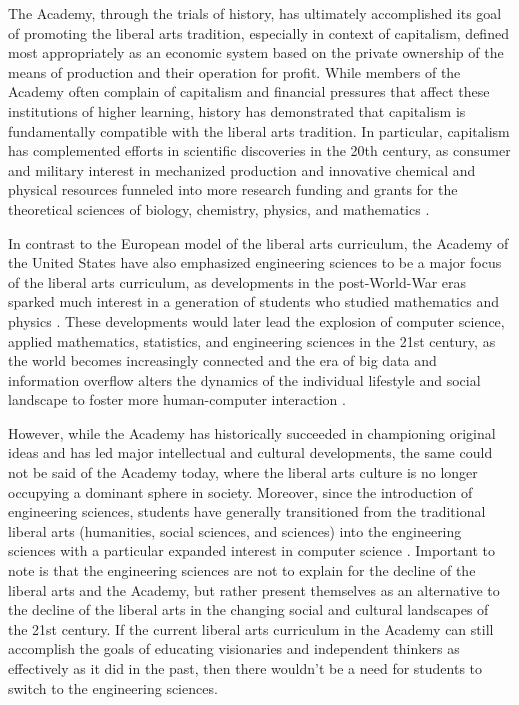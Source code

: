 \documentclass[12pt,letterpaper]{article}
\begin{document}
The Academy, through the trials of history, has ultimately accomplished its goal of promoting the liberal arts tradition, especially in context of capitalism, defined most appropriately as an economic system based on the private ownership of the means of production and their operation for profit.  While members of the Academy often complain of capitalism and financial pressures that affect these institutions of higher learning, history has demonstrated that capitalism is fundamentally compatible with the liberal arts tradition.  In particular, capitalism has complemented efforts in scientific discoveries in the 20th century, as consumer and military interest in mechanized production and innovative chemical and physical resources funneled into more research funding and grants for the theoretical sciences of biology, chemistry, physics, and mathematics \cite{}.  

In contrast to the European model of the liberal arts curriculum, the Academy of the United States have also emphasized engineering sciences to be a major focus of the liberal arts curriculum, as developments in the post-World-War eras sparked much interest in a generation of students who studied mathematics and physics \cite{}.  These developments would later lead the explosion of computer science, applied mathematics, statistics, and engineering sciences in the 21st century, as the world becomes increasingly connected and the era of big data and information overflow alters the dynamics of the individual lifestyle and social landscape to foster more human-computer interaction \cite{}.  

However, while the Academy has historically succeeded in championing original ideas and has led major intellectual and cultural developments, the same could not be said of the Academy today, where the liberal arts culture is no longer occupying a dominant sphere in society.  Moreover, since the introduction of engineering sciences, students have generally transitioned from the traditional liberal arts (humanities, social sciences, and sciences) into the engineering sciences with a particular expanded interest in computer science \cite{}.  Important to note is that the engineering sciences are not to explain for the decline of the liberal arts and the Academy, but rather present themselves as an alternative to the decline of  the liberal arts in the changing social and cultural landscapes of the 21st century.  If the current liberal arts curriculum in the Academy can still accomplish the goals of educating visionaries and independent thinkers as effectively as it did in the past, then there wouldn't be a need for students to switch to the engineering sciences.
\end{document}
